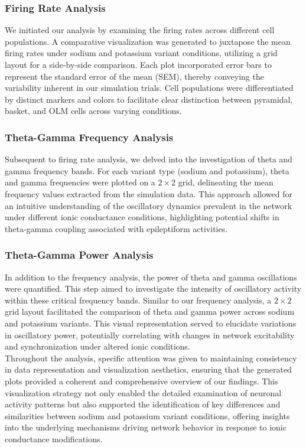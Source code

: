 \subsubsection{Firing Rate Analysis}
We initiated our analysis by examining the firing rates across different cell
populations. A comparative visualization was generated to juxtapose the mean
firing rates under sodium and potassium variant conditions, utilizing a grid
layout for a side-by-side comparison. Each plot incorporated error bars to
represent the standard error of the mean (SEM), thereby conveying the
variability inherent in our simulation trials. Cell populations were
differentiated by distinct markers and colors to facilitate clear distinction
between pyramidal, basket, and OLM cells across varying conditions.

\subsubsection{Theta-Gamma Frequency Analysis}
Subsequent to firing rate analysis, we delved into the investigation of theta
and gamma frequency bands. For each variant type (sodium and potassium), theta
and gamma frequencies were plotted on a \(2\times2\) grid, delineating the mean
frequency values extracted from the simulation data. This approach allowed for
an intuitive understanding of the oscillatory dynamics prevalent in the network
under different ionic conductance conditions, highlighting potential shifts in
theta-gamma coupling associated with epileptiform activities.

\subsubsection{Theta-Gamma Power Analysis}
In addition to the frequency analysis, the power of theta and gamma oscillations were quantified.
This step aimed to investigate the intensity of oscillatory activity within these critical frequency bands. 
Similar to our frequency analysis, a \(2\times2\) grid layout facilitated the comparison of theta and gamma power
across sodium and potassium variants. This visual representation served to
elucidate variations in oscillatory power, potentially correlating with changes
in network excitability and synchronization under altered ionic conditions.\\

\noindent Throughout the analysis, specific attention was given
to maintaining consistency in data representation and visualization aesthetics,
ensuring that the generated plots provided a coherent and comprehensive
overview of our findings. This visualization strategy not only enabled the
detailed examination of neuronal activity patterns but also supported the
identification of key differences and similarities between sodium and potassium
variant conditions, offering insights into the underlying mechanisms driving
network behavior in response to ionic conductance modifications.

